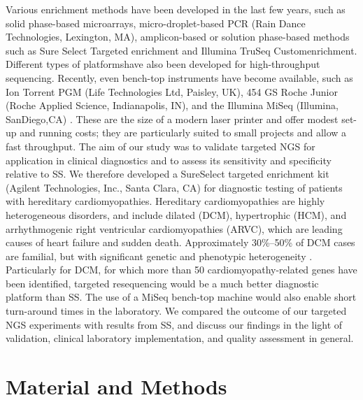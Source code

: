 Various enrichment methods have been developed in the last few years, such as solid phase-based microarrays, micro-droplet-based PCR (Rain Dance Technologies, Lexington, MA), amplicon-based or solution phase-based methods such as Sure Select Targeted enrichment and Illumina TruSeq Customenrichment. 
Different types of platformshave also been developed for high-throughput sequencing. 
Recently, even bench-top instruments have become available, such as Ion Torrent PGM (Life Technologies Ltd, Paisley, UK), 454 GS Roche Junior (Roche Applied Science, Indianapolis, IN), and the Illumina MiSeq (Illumina, SanDiego,CA) \cite{Loman_2012}. 
These are the size of a modern laser printer and offer modest set-up and running costs; they are particularly suited to small projects and allow a fast throughput. 
The aim of our study was to validate targeted NGS for application in clinical diagnostics and to assess its sensitivity and specificity relative to SS. 
We therefore developed a SureSelect targeted enrichment kit (Agilent Technologies, Inc., Santa Clara, CA) for diagnostic testing of patients with hereditary cardiomyopathies. 
Hereditary cardiomyopathies are highly heterogeneous disorders, and include dilated (DCM), hypertrophic (HCM), and arrhythmogenic right ventricular cardiomyopathies (ARVC), which are leading causes of heart failure and sudden death. 
Approximately 30\%–50\% of DCM cases are familial, but with significant genetic and phenotypic heterogeneity \cite{Posafalvi_2012}. 
Particularly for DCM, for which more than 50 cardiomyopathy-related genes have been identified, targeted resequencing would be a much better diagnostic platform than SS. 
The use of a MiSeq bench-top machine would also enable short turn-around times in the laboratory. 
We compared the outcome of our targeted NGS experiments with results from SS, and discuss our findings in the light of validation, clinical laboratory implementation, and quality assessment in general.

\section{Material and Methods}

